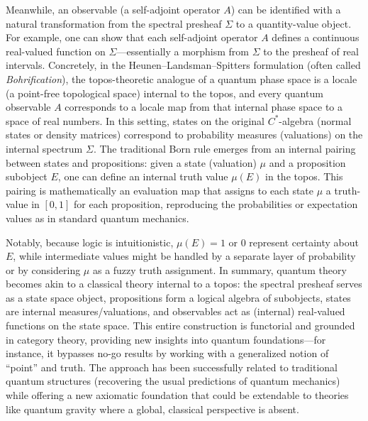 \documentclass[12pt]{article}
\begin{document}
Meanwhile, an observable (a self-adjoint operator $A$) can be identified with a natural transformation from the spectral presheaf $\Sigma$ to a quantity-value object. For example, one can show that each self-adjoint operator $A$ defines a continuous real-valued function on $\Sigma$---essentially a morphism from $\Sigma$ to the presheaf of real intervals. Concretely, in the Heunen--Landsman--Spitters formulation (often called \emph{Bohrification}), the topos-theoretic analogue of a quantum phase space is a locale (a point-free topological space) internal to the topos, and every quantum observable $A$ corresponds to a locale map from that internal phase space to a space of real numbers. In this setting, states on the original $C^*$-algebra (normal states or density matrices) correspond to probability measures (valuations) on the internal spectrum $\Sigma$. The traditional Born rule emerges from an internal pairing between states and propositions: given a state (valuation) $\mu$ and a proposition subobject $E$, one can define an internal truth value $\mu(E)$ in the topos. This pairing is mathematically an evaluation map that assigns to each state $\mu$ a truth-value in $[0,1]$ for each proposition, reproducing the probabilities or expectation values as in standard quantum mechanics.

Notably, because logic is intuitionistic, $\mu(E)=1$ or $0$ represent certainty about $E$, while intermediate values might be handled by a separate layer of probability or by considering $\mu$ as a fuzzy truth assignment. In summary, quantum theory becomes akin to a classical theory internal to a topos: the spectral presheaf serves as a state space object, propositions form a logical algebra of subobjects, states are internal measures/valuations, and observables act as (internal) real-valued functions on the state space. This entire construction is functorial and grounded in category theory, providing new insights into quantum foundations---for instance, it bypasses no-go results by working with a generalized notion of ``point'' and truth. The approach has been successfully related to traditional quantum structures (recovering the usual predictions of quantum mechanics) while offering a new axiomatic foundation that could be extendable to theories like quantum gravity where a global, classical perspective is absent.

\end{document}

